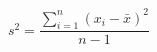 \documentclass[12pt]{article}
\begin{document}
  \begin{displaymath}
    s^2 = \frac{ \sum\limits_{i=1}^n (x_i - \bar{x})^2 } {n-1}
  \end{displaymath}
\end{document}
